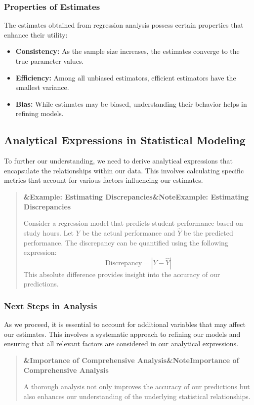\documentclass[a4paper]{article}
\newcommand{\boxheading}[1]{%
  \par\smallskip
  \noindent\textbf{\ifx&#1&Note\else#1\fi}\par
  \smallskip
}
\newenvironment{exbox}[1][]{%
  \begin{quote}\color{brown!70!black}\boxheading{#1}\normalcolor
}{\end{quote}}
\newenvironment{rembox}[1][]{%
  \begin{quote}\color{black!70}\boxheading{#1}\normalcolor
}{\end{quote}}
\begin{document}
\subsubsection{Properties of Estimates}
The estimates obtained from regression analysis possess certain properties that enhance their utility:

\begin{itemize}
    \item \textbf{Consistency:} As the sample size increases, the estimates converge to the true parameter values.
    \item \textbf{Efficiency:} Among all unbiased estimators, efficient estimators have the smallest variance.
    \item \textbf{Bias:} While estimates may be biased, understanding their behavior helps in refining models.
\end{itemize}

\subsection{Analytical Expressions in Statistical Modeling}
To further our understanding, we need to derive analytical expressions that encapsulate the relationships within our data. This involves calculating specific metrics that account for various factors influencing our estimates.

\begin{exbox}[Example: Estimating Discrepancies]
Consider a regression model that predicts student performance based on study hours. Let \( Y \) be the actual performance and \( \hat{Y} \) be the predicted performance. The discrepancy can be quantified using the following expression:
\[
\text{Discrepancy} = |Y - \hat{Y}|
\]
This absolute difference provides insight into the accuracy of our predictions.
\end{exbox}

\subsubsection{Next Steps in Analysis}
As we proceed, it is essential to account for additional variables that may affect our estimates. This involves a systematic approach to refining our models and ensuring that all relevant factors are considered in our analytical expressions.

\begin{rembox}[Importance of Comprehensive Analysis]
A thorough analysis not only improves the accuracy of our predictions but also enhances our understanding of the underlying statistical relationships.
\end{rembox}
\end{document}
